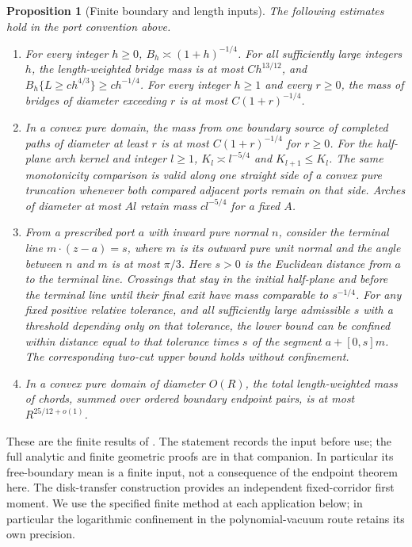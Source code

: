\documentclass[11pt]{article}
\numberwithin{equation}{section}
\newtheorem{proposition}[theorem]{Proposition}
\theoremstyle{definition}\newtheorem{definition}[theorem]{Definition}
\theoremstyle{remark}\newtheorem{remark}[theorem]{Remark}
\begin{document}
\begin{proposition}[Finite boundary and length inputs]\label{c:finite}
The following estimates hold in the port convention above.
\begin{enumerate}
\item For every integer $h\ge0$, $B_h\asymp(1+h)^{-1/4}$.
For all sufficiently large integers $h$, the length-weighted
bridge mass is at most $Ch^{13/12}$, and
$B_h\{L\ge ch^{4/3}\}\ge ch^{-1/4}$.
For every integer $h\ge1$ and every $r\ge0$, the mass of
bridges of diameter exceeding $r$ is at most $C(1+r)^{-1/4}$.
\item In a convex pure domain, the mass from one boundary source of
completed paths of diameter at least $r$ is at most $C(1+r)^{-1/4}$
for $r\ge0$.
For the half-plane arch kernel and integer $l\ge1$,
$K_l\asymp l^{-5/4}$ and $K_{l+1}\le K_l$.
The same monotonicity comparison is valid along one straight side
of a convex pure truncation whenever both compared adjacent ports
remain on that side. Arches of diameter at most
$Al$ retain mass $cl^{-5/4}$ for a fixed $A$.
\item From a prescribed port $a$ with inward pure normal $n$, consider
the terminal line $m\cdot(z-a)=s$, where $m$ is its outward pure unit
normal and the angle between $n$ and $m$ is at most $\pi/3$.
Here $s>0$ is the Euclidean distance from $a$ to the terminal line.
Crossings that stay in the initial half-plane and before the terminal
line until their final exit have mass comparable to $s^{-1/4}$.
For any fixed positive relative tolerance, and all sufficiently large
admissible $s$ with a threshold depending only on that tolerance, the lower
bound can be confined within distance equal to that tolerance times $s$
of the segment $a+[0,s]m$. The corresponding two-cut upper
bound holds without confinement.
\item In a convex pure domain of diameter $O(R)$, the total
length-weighted mass of chords, summed over ordered boundary endpoint
pairs, is at most $R^{25/12+o(1)}$.
\end{enumerate}
\end{proposition}
These are the finite results of \cite[Theorem 1.1, Propositions 7.1, 7.4, 10.1 and Corollary 8.1]{UniformMarked}. The statement records the input
before use; the full analytic and finite geometric proofs are in that
companion. In particular its free-boundary mean is a finite input, not a
consequence of the endpoint theorem here. The disk-transfer construction
\cite[Theorem 1.1]{DiskTransfer} provides an independent fixed-corridor first moment.
We use the specified finite method at each application below; in particular
the logarithmic confinement in the polynomial-vacuum route retains its
own precision.
\end{document}
